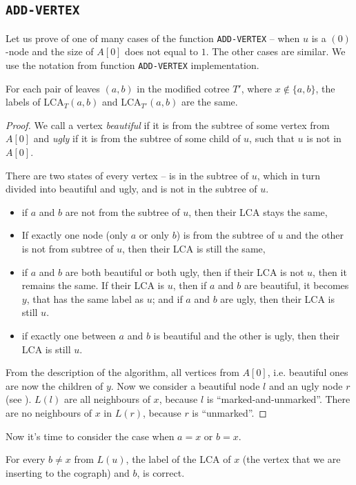 \subsection{\texttt{ADD-VERTEX}}
Let us prove of one of many cases of the function \texttt{ADD-VERTEX} -- when $u$ is a $(0)$-node and the size of $A[0]$ does not equal to $1$. The other cases are similar. We use the notation from function \texttt{ADD-VERTEX} implementation. 
\begin{theorem}
    For each pair of leaves $(a,b)$ in the modified cotree $T'$, where $x \notin \{a, b\}$, the labels of LCA$_T(a,b)$ and LCA$_{T'}(a,b)$ are the same.
\end{theorem}
\begin{proof}
We call a vertex \emph{beautiful} if it is from the subtree of some vertex from $A[0]$ and \emph{ugly} if it is from the subtree of some child of $u$, such that $u$ is not in $A[0]$.

There are two states of every vertex -- is in the subtree of $u$, which in turn divided into beautiful and ugly, and is not in the subtree of $u$.
        \begin{itemize}
            \item if $a$ and $b$ are not from the subtree of $u$, then their LCA stays the same,
            \item If exactly one node (only $a$ or only $b$) is from the subtree of $u$ and the other is not from subtree of $u$, then their LCA is still the same,
            \item if $a$ and $b$ are both beautiful or both ugly, then if their LCA is not $u$, then it remains the same. If their LCA is $u$, then if $a$ and $b$ are beautiful, it becomes $y$, that has the same label as $u$; and if $a$ and $b$ are ugly, then their LCA is still $u$.
            \item if exactly one between $a$ and $b$ is beautiful and the other is ugly, then their LCA is still $u$.
        
        \end{itemize}
From the description of the algorithm, all vertices from $A[0]$, i.e. beautiful ones are now the children of $y$. Now we consider a beautiful node $l$ and an ugly node $r$ (see ). $L(l)$ are all neighbours of $x$, because $l$ is ``marked-and-unmarked''. There are no neighbours of $x$ in $L(r)$, because $r$ is ``unmarked''.
\end{proof}
Now it's time to consider the case when $a=x$ or $b=x$. 
\begin{theorem}
    For every $b \neq x$ from $L(u)$, the label of the LCA of $x$ (the vertex that we are inserting to the cograph) and $b$, is correct.
\end{theorem}
